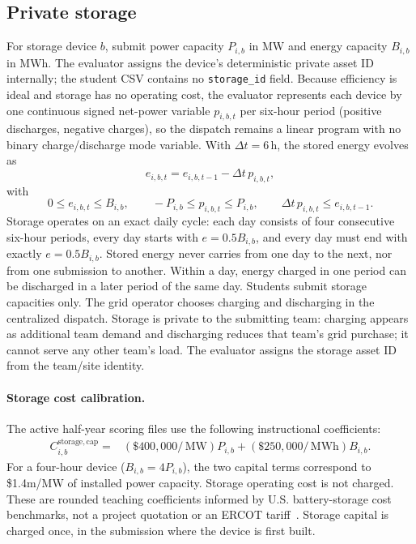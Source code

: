 \documentclass[12pt]{article}
\newcommand{\code}[1]{\texttt{#1}}
\newcommand{\MW}{\,\mathrm{MW}}
\newcommand{\MWh}{\,\mathrm{MWh}}
\newcommand{\USD}{\$}
\begin{document}
\subsection{Private storage}

For storage device $b$, submit power capacity $P_{i,b}$ in MW and energy
capacity $B_{i,b}$ in MWh. The evaluator assigns the device's deterministic
private asset ID internally; the student CSV contains no \code{storage\_id}
field. Because efficiency is ideal and storage has no operating cost, the
evaluator represents each device by one continuous signed net-power variable
$p_{i,b,t}$ per six-hour period (positive discharges, negative charges), so the
dispatch remains a linear program with no binary charge/discharge mode
variable. With $\Delta t=6$\,h, the stored energy evolves as
\[
  e_{i,b,t}=e_{i,b,t-1}-\Delta t\,p_{i,b,t},
\]
with
\[
  0\le e_{i,b,t}\le B_{i,b},\qquad
  -P_{i,b}\le p_{i,b,t}\le P_{i,b},\qquad
  \Delta t\,p_{i,b,t}\le e_{i,b,t-1}.
\]
Storage operates on an exact daily cycle: each day consists of four
consecutive six-hour periods, every day starts with $e=0.5B_{i,b}$, and every
day must end with exactly $e=0.5B_{i,b}$. Stored energy never carries from one
day to the next, nor from one submission to another. Within a day, energy
charged in one period can be discharged in a later period of the same day.
Students submit storage capacities only. The grid operator chooses charging and
discharging in the centralized dispatch. Storage is private to the submitting
team: charging appears as additional team demand and discharging reduces that
team's grid purchase; it cannot serve any other team's load. The evaluator
assigns the storage asset ID from the team/site identity.

\paragraph{Storage cost calibration.} The active half-year scoring files use
the following instructional coefficients:
\begin{align*}
 C^{\mathrm{storage,cap}}_{i,b}={}&
 (\USD400{,}000/\MW)P_{i,b}
 +(\USD250{,}000/\MWh)B_{i,b}.
\end{align*}
For a four-hour device ($B_{i,b}=4P_{i,b}$), the two capital terms correspond to
\USD1.4m/MW of installed power capacity. Storage operating cost is not charged.
These are rounded teaching coefficients informed by U.S. battery-storage cost
benchmarks, not a project quotation or an ERCOT tariff~\cite{eia2024bess,
nrel2023bess}. Storage capital is charged once, in the submission where the
device is first built.
\end{document}
